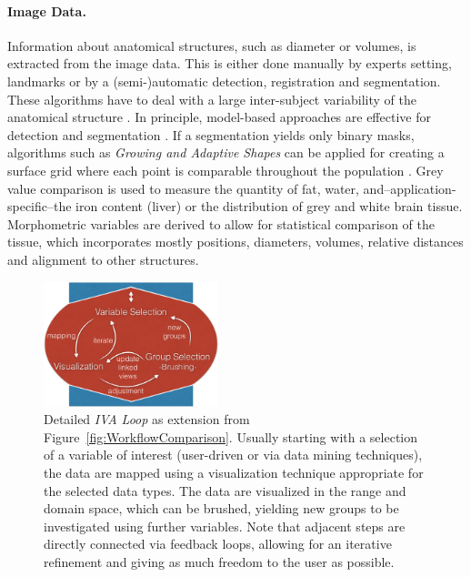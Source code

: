 \documentclass[journal]{style/vgtc} 			          %
\begin{document}
\paragraph{Image Data. }
Information about anatomical structures, such as diameter or volumes, is extracted from the image data.
%
This is either done manually by experts setting, landmarks or by a (semi-)automatic detection, registration and segmentation.
%
These algorithms have to deal with a large inter-subject variability of the anatomical structure \cite{Preim2014}.
%
In principle, model-based approaches are effective for detection \cite{Rak2013} and segmentation \cite{Gloger2010}. %
%
If a segmentation yields only binary masks, algorithms such as \emph{Growing and Adaptive Shapes} can be applied for creating a surface grid where each point is comparable throughout the population \cite{Ferrarini2007}.
%
Grey value comparison is used to measure the quantity of fat, water, and--application-specific--the iron content (liver) or the distribution of grey and white brain tissue.
%
Morphometric variables are derived to allow for statistical comparison of the tissue, which incorporates mostly positions, diameters, volumes, relative distances and alignment to other structures.
\begin{figure}[htb]
 \centering
 \includegraphics[width=2.0in]{figures/InteractionLoop}
 \caption{Detailed \emph{IVA Loop} as extension from Figure~\ref{fig:WorkflowComparison}.
 Usually starting with a selection of a variable of interest (user-driven or via data mining techniques), the data are mapped using a visualization technique appropriate for the selected data types.
 The data are visualized in the range and domain space, which can be brushed, yielding new groups to be investigated using further variables.
 Note that adjacent steps are directly connected via feedback loops, allowing for an iterative refinement and giving as much freedom to the user as possible.}
 \label{fig:InteractionLoop}
\end{figure}
\end{document}
